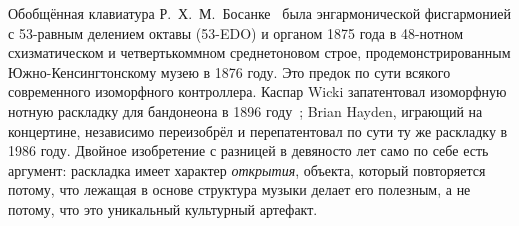 \documentclass[10pt,letterpaper,twocolumn]{article}
\begin{document}
Обобщённая клавиатура Р.\ Х.\ М.\ Босанке~\citep{bosanquet1875generalized} была энгармонической фисгармонией с 53-равным делением октавы (53-EDO) и органом 1875 года в 48-нотном схизматическом и четвертькоммном среднетоновом строе, продемонстрированным Южно-Кенсингтонскому музею в 1876 году. Это предок по сути всякого современного изоморфного контроллера. Каспар Wicki запатентовал изоморфную нотную раскладку для бандонеона в 1896 году~\citep{wicki1896}; Brian Hayden, играющий на концертине, независимо переизобрёл и перепатентовал по сути ту же раскладку в 1986 году. Двойное изобретение с разницей в девяносто лет само по себе есть аргумент: раскладка имеет характер \emph{открытия}, объекта, который повторяется потому, что лежащая в основе структура музыки делает его полезным, а не потому, что это уникальный культурный артефакт.
\end{document}
